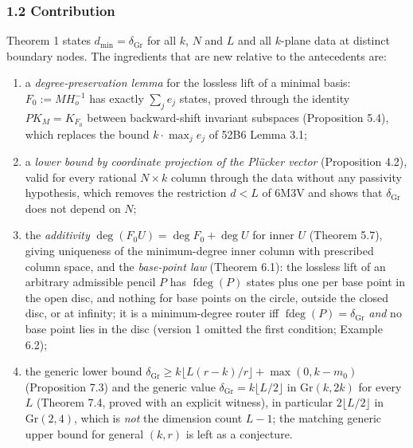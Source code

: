 \documentclass[
  11pt,
  a4paper,
]{article}
\providecommand{\tightlist}{%
  \setlength{\itemsep}{0pt}\setlength{\parskip}{0pt}}
\begin{document}
\subsubsection{1.2 Contribution}\label{contribution}

Theorem 1 states \(d_{\min}=\delta_{\mathrm{Gr}}\) for all \(k\), \(N\)
and \(L\) and all \(k\)-plane data at distinct boundary nodes. The
ingredients that are new relative to the antecedents are:

\begin{enumerate}
\def\labelenumi{\arabic{enumi}.}
\tightlist
\item
  a \emph{degree-preservation lemma} for the lossless lift of a minimal
  basis: \(F_0:=MH_o^{-1}\) has exactly \(\sum_je_j\) states, proved
  through the identity \(PK_M=K_{F_0}\) between backward-shift invariant
  subspaces (Proposition 5.4), which replaces the bound
  \(k\cdot\max_je_j\) of 52B6 Lemma 3.1;
\item
  a \emph{lower bound by coordinate projection of the Plücker vector}
  (Proposition 4.2), valid for every rational \(N\times k\) column
  through the data without any passivity hypothesis, which removes the
  restriction \(d<L\) of 6M3V and shows that \(\delta_{\mathrm{Gr}}\)
  does not depend on \(N\);
\item
  the \emph{additivity} \(\deg(F_0U)=\deg F_0+\deg U\) for inner \(U\)
  (Theorem 5.7), giving uniqueness of the minimum-degree inner column
  with prescribed column space, and the \emph{base-point law} (Theorem
  6.1): the lossless lift of an arbitrary admissible pencil \(P\) has
  \(\operatorname{fdeg}(P)\) states plus one per base point in the open
  disc, and nothing for base points on the circle, outside the closed
  disc, or at infinity; it is a minimum-degree router iff
  \(\operatorname{fdeg}(P)=\delta_{\mathrm{Gr}}\) \emph{and} no base
  point lies in the disc (version 1 omitted the first condition; Example
  6.2);
\item
  the generic lower bound
  \(\delta_{\mathrm{Gr}}\ge k\lfloor L(r-k)/r\rfloor+\max(0,\allowbreak{}k-m_0)\)
  (Proposition 7.3) and the generic value
  \(\delta_{\mathrm{Gr}}=k\lfloor L/2\rfloor\) in \(\mathrm{Gr}(k,\allowbreak{}2k)\)
  for every \(L\) (Theorem 7.4, proved with an explicit witness), in
  particular \(2\lfloor L/2\rfloor\) in \(\mathrm{Gr}(2,\allowbreak{}4)\), which is
  \emph{not} the dimension count \(L-1\); the matching generic upper
  bound for general \((k,\allowbreak{}r)\) is left as a conjecture.
\end{enumerate}
\end{document}
